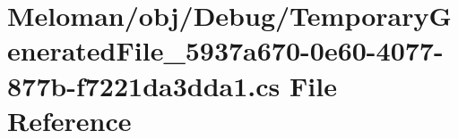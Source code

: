 \hypertarget{_temporary_generated_file__5937a670-0e60-4077-877b-f7221da3dda1_8cs}{}\section{Meloman/obj/\+Debug/\+Temporary\+Generated\+File\+\_\+5937a670-\/0e60-\/4077-\/877b-\/f7221da3dda1.cs File Reference}
\label{_temporary_generated_file__5937a670-0e60-4077-877b-f7221da3dda1_8cs}
